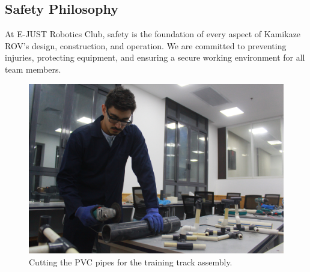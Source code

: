 \subsection{Safety Philosophy}

At E-JUST Robotics Club, safety is the foundation of every aspect of Kamikaze ROV’s design, construction, and operation. We are committed to preventing injuries, protecting equipment, and ensuring a secure working environment for all team members.

\begin{figure}[h]
    \centering
    \includegraphics[width=\columnwidth]{Sections/3Safety/images/safety.jpg}
    \caption{Cutting the PVC pipes for the training track
    assembly.}
    \label{fig:safety}
\end{figure}